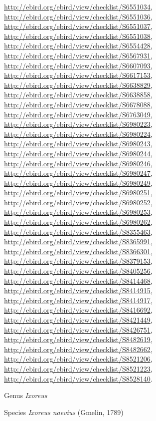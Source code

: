 \documentclass[9pt, article]{memoir}
\begin{document}
\begin{multicols}{2}
\url{http://ebird.org/ebird/view/checklist/S6551034}, 
\url{http://ebird.org/ebird/view/checklist/S6551036}, 
\url{http://ebird.org/ebird/view/checklist/S6551037}, 
\url{http://ebird.org/ebird/view/checklist/S6551038}, 
\url{http://ebird.org/ebird/view/checklist/S6554428}, 
\url{http://ebird.org/ebird/view/checklist/S6567931}, 
\url{http://ebird.org/ebird/view/checklist/S6607093}, 
\url{http://ebird.org/ebird/view/checklist/S6617153}, 
\url{http://ebird.org/ebird/view/checklist/S6638829}, 
\url{http://ebird.org/ebird/view/checklist/S6638858}, 
\url{http://ebird.org/ebird/view/checklist/S6678088}, 
\url{http://ebird.org/ebird/view/checklist/S6763049}, 
\url{http://ebird.org/ebird/view/checklist/S6980223}, 
\url{http://ebird.org/ebird/view/checklist/S6980224}, 
\url{http://ebird.org/ebird/view/checklist/S6980243}, 
\url{http://ebird.org/ebird/view/checklist/S6980244}, 
\url{http://ebird.org/ebird/view/checklist/S6980246}, 
\url{http://ebird.org/ebird/view/checklist/S6980247}, 
\url{http://ebird.org/ebird/view/checklist/S6980249}, 
\url{http://ebird.org/ebird/view/checklist/S6980251}, 
\url{http://ebird.org/ebird/view/checklist/S6980252}, 
\url{http://ebird.org/ebird/view/checklist/S6980253}, 
\url{http://ebird.org/ebird/view/checklist/S6980262}, 
\url{http://ebird.org/ebird/view/checklist/S8355463}, 
\url{http://ebird.org/ebird/view/checklist/S8365991}, 
\url{http://ebird.org/ebird/view/checklist/S8366301}, 
\url{http://ebird.org/ebird/view/checklist/S8379153}, 
\url{http://ebird.org/ebird/view/checklist/S8405256}, 
\url{http://ebird.org/ebird/view/checklist/S8414468}, 
\url{http://ebird.org/ebird/view/checklist/S8414915}, 
\url{http://ebird.org/ebird/view/checklist/S8414917}, 
\url{http://ebird.org/ebird/view/checklist/S8416692}, 
\url{http://ebird.org/ebird/view/checklist/S8421449}, 
\url{http://ebird.org/ebird/view/checklist/S8426751}, 
\url{http://ebird.org/ebird/view/checklist/S8482619}, 
\url{http://ebird.org/ebird/view/checklist/S8482662}, 
\url{http://ebird.org/ebird/view/checklist/S8521206}, 
\url{http://ebird.org/ebird/view/checklist/S8521223}, 
\url{http://ebird.org/ebird/view/checklist/S8528140}.

\vspace{6pt}\noindent\hspace{30pt}Genus \textit{Ixoreus}


\vspace{6pt}\noindent\hspace{36pt}Species \textit{Ixoreus naevius} (Gmelin, 1789)



\end{multicols}
\end{document}
